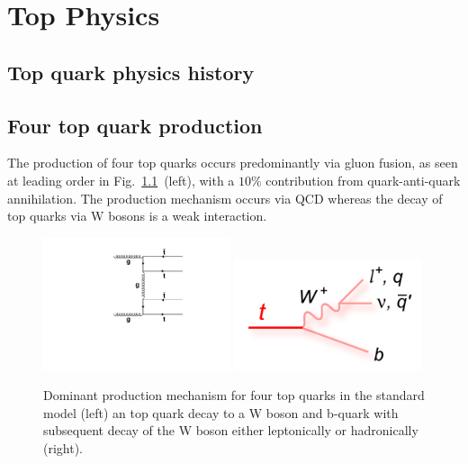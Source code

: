 \chapter{Top Physics}
\label{c:topPhys}


\section{Top quark physics history}

\section{Four top quark production}

The production of four top quarks occurs predominantly via gluon fusion, as seen at leading order in Fig.~\ref{fig:ttttAtLO}~(left), with a $10\%$ contribution from quark-anti-quark annihilation. The production mechanism occurs via QCD whereas the decay of top quarks via W bosons is a weak interaction. 

\begin{figure}[ht!]
\begin{center}
    \includegraphics[width=0.49\textwidth]{images/Theory/tttt_t_LO.pdf}
    \includegraphics[width=0.49\textwidth]{images/Theory/topdecay.png}
    \caption{Dominant production mechanism for four top quarks in the standard model (left) an top quark decay to a W boson and b-quark with subsequent decay of the W boson either leptonically or hadronically (right).}
    \label{fig:ttttAtLO}
\end{center}
\end{figure}

